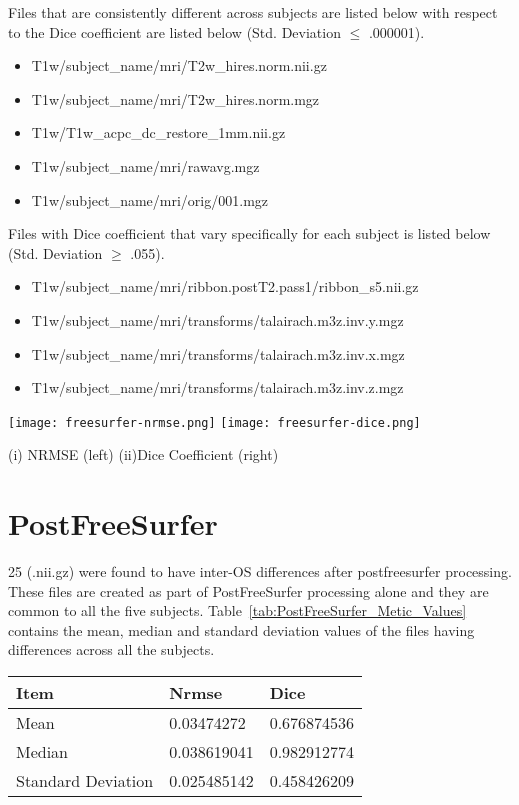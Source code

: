 Files that are consistently different across subjects are listed below with respect to the Dice coefficient are listed below (Std. Deviation $\leq$ .000001).
\begin{itemize}
  \item T1w/subject\_name/mri/T2w\_hires.norm.nii.gz
  \item T1w/subject\_name/mri/T2w\_hires.norm.mgz
  \item T1w/T1w\_acpc\_dc\_restore\_1mm.nii.gz
  \item T1w/subject\_name/mri/rawavg.mgz
  \item T1w/subject\_name/mri/orig/001.mgz
\end{itemize}

Files with Dice coefficient that vary specifically for each subject is listed below (Std. Deviation $\geq$ .055).
\begin{itemize}
\item T1w/subject\_name/mri/ribbon.postT2.pass1/ribbon\_s5.nii.gz
\item T1w/subject\_name/mri/transforms/talairach.m3z.inv.y.mgz
\item T1w/subject\_name/mri/transforms/talairach.m3z.inv.x.mgz
\item T1w/subject\_name/mri/transforms/talairach.m3z.inv.z.mgz
\end{itemize}
\hfill \break
\begin{center}
\texttt{[image: freesurfer-nrmse.png]}%
\texttt{[image: freesurfer-dice.png]}
\caption*{(i) NRMSE (left) (ii)Dice Coefficient (right)}
\label{fig:freesurfer_metric_values}
\end{center}

\section{PostFreeSurfer}\label{sec:Postfreesurfer}
25 (.nii.gz) were found to have inter-OS differences after postfreesurfer processing. These files are created as part of PostFreeSurfer processing alone and they are common to all the five subjects. Table~\ref{tab:PostFreeSurfer_Metic_Values} contains the mean, median and standard deviation values of the files having differences across all the subjects.
\hfill \break
\begin{center}
\begin{tabular}{|l|l|l|}
\hline
\textbf{Item}      & \textbf{Nrmse} & \textbf{Dice} \\ \hline
Mean               & 0.03474272     & 0.676874536   \\ \hline
Median             & 0.038619041    & 0.982912774   \\ \hline
Standard Deviation & 0.025485142    & 0.458426209   \\ \hline
\end{tabular}
\label{tab:PostFreeSurfer_Metic_Values}
\end{center}
\hfill \break

